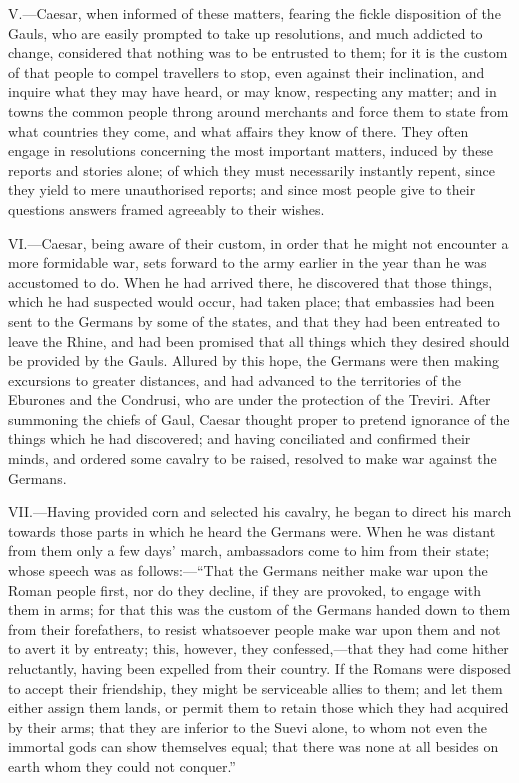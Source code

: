 V.—Caesar, when informed of these matters, fearing the fickle
disposition of the Gauls, who are easily prompted to take up
resolutions, and much addicted to change, considered that nothing was to
be entrusted to them; for it is the custom of that people to compel
travellers to stop, even against their inclination, and inquire what
they may have heard, or may know, respecting any matter; and in towns
the common people throng around merchants and force them to state from
what countries they come, and what affairs they know of there. They
often engage in resolutions concerning the most important matters,
induced by these reports and stories alone; of which they must
necessarily instantly repent, since they yield to mere unauthorised
reports; and since most people give to their questions answers framed
agreeably to their wishes.

VI.—Caesar, being aware of their custom, in order that he might not
encounter a more formidable war, sets forward to the army earlier in the
year than he was accustomed to do. When he had arrived there, he
discovered that those things, which he had suspected would occur, had
taken place; that embassies had been sent to the Germans by some of the
states, and that they had been entreated to leave the Rhine, and had
been promised that all things which they desired should be provided by
the Gauls. Allured by this hope, the Germans were then making excursions
to greater distances, and had advanced to the territories of the
Eburones and the Condrusi, who are under the protection of the Treviri.
After summoning the chiefs of Gaul, Caesar thought proper to pretend
ignorance of the things which he had discovered; and having conciliated
and confirmed their minds, and ordered some cavalry to be raised,
resolved to make war against the Germans.

VII.—Having provided corn and selected his cavalry, he began to direct
his march towards those parts in which he heard the Germans were. When
he was distant from them only a few days' march, ambassadors come to him
from their state; whose speech was as follows:—``That the Germans
neither make war upon the Roman people first, nor do they decline, if
they are provoked, to engage with them in arms; for that this was the
custom of the Germans handed down to them from their forefathers, to
resist whatsoever people make war upon them and not to avert it by
entreaty; this, however, they confessed,—that they had come hither
reluctantly, having been expelled from their country. If the Romans were
disposed to accept their friendship, they might be serviceable allies to
them; and let them either assign them lands, or permit them to retain
those which they had acquired by their arms; that they are inferior to
the Suevi alone, to whom not even the immortal gods can show themselves
equal; that there was none at all besides on earth whom they could not
conquer.''

